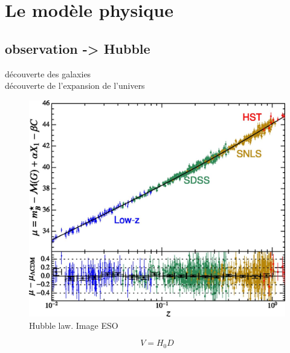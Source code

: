 \chapter{Le modèle physique} \label{ch:introduction_physique}


\section{observation -> Hubble}

découverte des galaxies\\
découverte de l'expansion de l'univers


\begin{figure}[bth]
        \includegraphics[width=.9\linewidth]{img/01/hubble_law.jpg} 
        \caption{Hubble law. 
        Image ESO}
 		\label{fig:hubble_law}
\end{figure}

\begin{equation}
V = H_0 D
\end{equation}


